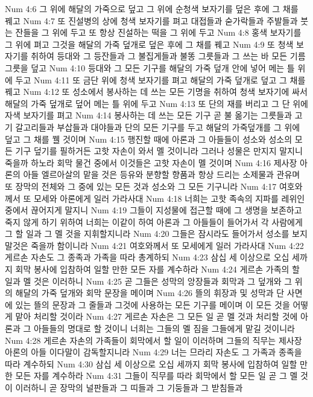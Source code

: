 Num 4:6  그 위에 해달의 가죽으로 덮고 그 위에 순청색 보자기를 덮은 후에 그 채를 꿰고
Num 4:7  또 진설병의 상에 청색 보자기를 펴고 대접들과 숟가락들과 주발들과 붓는 잔들을 그 위에 두고 또 항상 진설하는 떡을 그 위에 두고
Num 4:8  홍색 보자기를 그 위에 펴고 그것을 해달의 가죽 덮개로 덮은 후에 그 채를 꿰고
Num 4:9  또 청색 보자기를 취하여 등대와 그 등잔들과 그 불집게들과 불똥 그릇들과 그 쓰는 바 모든 기름 그릇을 덮고
Num 4:10  등대와 그 모든 기구를 해달의 가죽 덮개 안에 넣어 메는 틀 위에 두고
Num 4:11  또 금단 위에 청색 보자기를 펴고 해달의 가죽 덮개로 덮고 그 채를 꿰고
Num 4:12  또 성소에서 봉사하는 데 쓰는 모든 기명을 취하여 청색 보자기에 싸서 해달의 가죽 덮개로 덮어 메는 틀 위에 두고
Num 4:13  또 단의 재를 버리고 그 단 위에 자색 보자기를 펴고
Num 4:14  봉사하는 데 쓰는 모든 기구 곧 불 옮기는 그릇들과 고기 갈고리들과 부삽들과 대야들과 단의 모든 기구를 두고 해달의 가죽덮개를 그 위에 덮고 그 채를 꿸 것이며
Num 4:15  행진할 때에 아론과 그 아들들이 성소와 성소의 모든 기구 덮기를 필하거든 고핫 자손이 와서 멜 것이니라 그러나 성물은 만지지 말지니 죽을까 하노라 회막 물건 중에서 이것들은 고핫 자손이 멜 것이며
Num 4:16  제사장 아론의 아들 엘르아살의 맡을 것은 등유와 분향할 향품과 항상 드리는 소제물과 관유며 또 장막의 전체와 그 중에 있는 모든 것과 성소와 그 모든 기구니라
Num 4:17  여호와께서 또 모세와 아론에게 일러 가라사대
Num 4:18  너희는 고핫 족속의 지파를 레위인 중에서 끊어지게 말지니
Num 4:19  그들이 지성물에 접근할 때에 그 생명을 보존하고 죽지 않게 하기 위하여 너희는 이같이 하여 아론과 그 아들들이 들어가서 각 사람에게 그 할 일과 그 멜 것을 지휘할지니라
Num 4:20  그들은 잠시라도 들어가서 성소를 보지 말것은 죽을까 함이니라
Num 4:21  여호와께서 또 모세에게 일러 가라사대
Num 4:22  게르손 자손도 그 종족과 가족을 따라 총계하되
Num 4:23  삼십 세 이상으로 오십 세까지 회막 봉사에 입참하여 일할 만한 모든 자를 계수하라
Num 4:24  게르손 가족의 할 일과 멜 것은 이러하니
Num 4:25  곧 그들은 성막의 앙장들과 회막과 그 덮개와 그 위의 해달의 가죽 덮개와 회막 문장을 메이며
Num 4:26  뜰의 휘장과 및 성막과 단 사면에 있는 뜰의 문장과 그 줄들과 그것에 사용하는 모든 기구를 메이며 이 모든 것을 어떻게 맡아 처리할 것이라
Num 4:27  게르손 자손은 그 모든 일 곧 멜 것과 처리할 것에 아론과 그 아들들의 명대로 할 것이니 너희는 그들의 멜 짐을 그들에게 맡길 것이니라
Num 4:28  게르손 자손의 가족들이 회막에서 할 일이 이러하며 그들의 직무는 제사장 아론의 아들 이다말이 감독할지니라
Num 4:29  너는 므라리 자손도 그 가족과 종족을 따라 계수하되
Num 4:30  삼십 세 이상으로 오십 세까지 회막 봉사에 입참하여 일할 만한 모든 자를 계수하라
Num 4:31  그들이 직무를 따라 회막에서 할 모든 일 곧 그 멜 것이 이러하니 곧 장막의 널판들과 그 띠들과 그 기둥들과 그 받침들과
